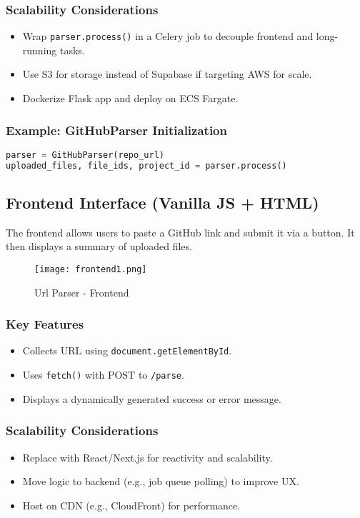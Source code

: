 \documentclass{article}
\begin{document}
\subsubsection{Scalability Considerations}
\begin{itemize}
    \item Wrap \texttt{parser.process()} in a Celery job to decouple frontend and long-running tasks.
    \item Use S3 for storage instead of Supabase if targeting AWS for scale.
    \item Dockerize Flask app and deploy on ECS Fargate.
\end{itemize}

\subsubsection{Example: GitHubParser Initialization}
\begin{lstlisting}[language=Python]
parser = GitHubParser(repo_url)
uploaded_files, file_ids, project_id = parser.process()
\end{lstlisting}

\subsection{Frontend Interface (Vanilla JS + HTML)}
The frontend allows users to paste a GitHub link and submit it via a button. It then displays a summary of uploaded files.

\begin{figure}[h!]
    \centering
    \texttt{[image: frontend1.png]}
    \caption{Url Parser - Frontend}
\end{figure}

\subsubsection{Key Features}
\begin{itemize}
    \item Collects URL using \texttt{document.getElementById}.
    \item Uses \texttt{fetch()} with POST to \texttt{/parse}.
    \item Displays a dynamically generated success or error message.
\end{itemize}

\subsubsection{Scalability Considerations}
\begin{itemize}
    \item Replace with React/Next.js for reactivity and scalability.
    \item Move logic to backend (e.g., job queue polling) to improve UX.
    \item Host on CDN (e.g., CloudFront) for performance.
\end{itemize}
\end{document}
